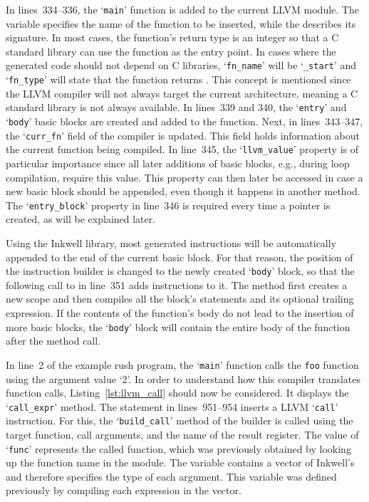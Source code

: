 In lines~334--336, the `\texttt{main}' function is added to the current LLVM module.
The variable  specifies the name of the function to be inserted, while the  describes its signature.
In most cases, the  function's return type is an integer so that a C standard library can use the function as the entry point.
In cases where the generated code should not depend on C libraries, `\Verb|fn_name|' will be `\Verb|_start|' and `\Verb|fn_type|' will state that the function returns .
This concept is mentioned since the LLVM compiler will not always target the current architecture,
meaning a C standard library is not always available.
In lines~339 and 340, the `\texttt{entry}' and `\texttt{body}' basic blocks are created and added to the function.
Next, in lines~343--347, the `\Verb|curr_fn|' field of the compiler is updated.
This field holds information about the current function being compiled.
In line~345, the `\Verb|llvm_value|' property is of particular importance since all later additions of basic blocks, e.g., during loop compilation, require this value.
This property can then later be accessed in case a new basic block should be appended, even though it happens in another method.
The `\Verb|entry_block|' property in line~346 is required every time a pointer is created, as will be explained later.

Using the Inkwell library, most generated instructions will be automatically appended to the end of the current basic block.
For that reason, the position of the instruction builder is changed to the newly created `\texttt{body}' block,
so that the following call to  in line~351 adds instructions to it.
The  method first creates a new scope and then compiles all the block's statements and its optional trailing expression.
If the contents of the  function's body do not lead to the insertion of more basic blocks,
the `\texttt{body}' block will contain the entire body of the function after the method call.


In line~2 of the example rush program, the `\texttt{main}' function calls the \texttt{foo} function using the argument value `2'.
In order to understand how this compiler translates function calls, Listing~\ref{lst:llvm_call} should now be considered.
It displays the `\Verb|call_expr|' method.
The statement in lines~951--954 inserts a LLVM `\texttt{call}' instruction.
For this, the `\Verb|build_call|' method of the builder is called using the target function, call arguments, and the name of the result register.
The value of `\texttt{func}' represents the called function, which was previously obtained by looking up the function name in the module.
The  variable contains a vector of Inkwell's  and therefore specifies the type of each argument.
This variable was defined previously by compiling each expression in the  vector.

